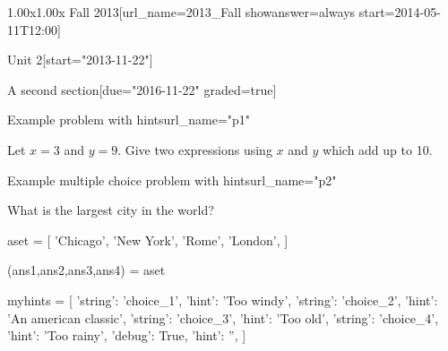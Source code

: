 \documentclass[12pt]{article}
\begin{document}
\begin{edXcourse}{1.00x}{1.00x Fall 2013}[url_name=2013_Fall showanswer=always start=2014-05-11T12:00]
\begin{edXchapter}{Unit 2}[start="2013-11-22"]
\begin{edXsection}{A second section}[due="2016-11-22" graded=true]
\begin{edXproblem}{Example problem with hints}{url_name="p1"}
 
Let $x=3$ and $y=9$.  Give two expressions using $x$ and $y$ which add
up to 10.



\end{edXproblem}


\begin{edXproblem}{Example multiple choice problem with hints}{url_name="p2"}
 
What is the largest city in the world?

\begin{edXscript}
aset = [ 'Chicago',
         'New York',
         'Rome',
         'London',
      ]

(ans1,ans2,ans3,ans4) = aset

myhints = [ {'string': 'choice_1', 'hint': 'Too windy'},
            {'string': 'choice_2', 'hint': 'An american classic'},
            {'string': 'choice_3', 'hint': 'Too old'},
            {'string': 'choice_4', 'hint': 'Too rainy'},
            {'debug': True, 'hint': ''},
          ]
  
\end{edXscript}


\end{edXproblem}


\end{edXsection}
\end{edXchapter}
\end{edXcourse}

\end{document}
